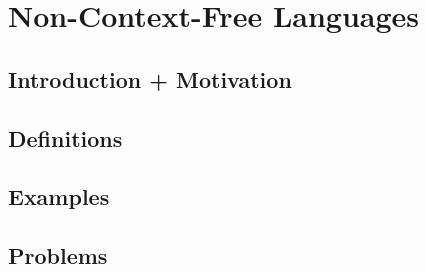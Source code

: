 \chapter{Non-Context-Free Languages}

\section{Introduction + Motivation}

\section{Definitions}

\section{Examples}

\section{Problems}